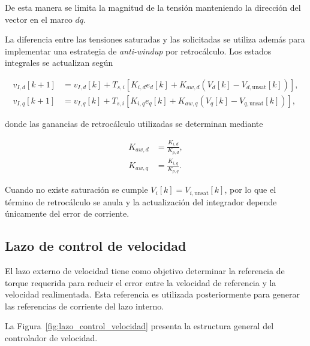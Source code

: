 De esta manera se limita la magnitud de la tensión manteniendo la
dirección del vector en el marco $dq$.

La diferencia entre las tensiones saturadas y las solicitadas se
utiliza además para implementar una estrategia de
\textit{anti-windup} por retrocálculo. Los estados integrales se
actualizan según

\begin{align}
v_{I,d}[k+1]
&=
v_{I,d}[k]
+
T_{s,i}
\left[
K_{i,d}e_d[k]
+
K_{aw,d}
\left(
V_d[k]-V_{d,\mathrm{unsat}}[k]
\right)
\right],
\label{eq:antiwindup_d}
\\
v_{I,q}[k+1]
&=
v_{I,q}[k]
+
T_{s,i}
\left[
K_{i,q}e_q[k]
+
K_{aw,q}
\left(
V_q[k]-V_{q,\mathrm{unsat}}[k]
\right)
\right],
\label{eq:antiwindup_q}
\end{align}

donde las ganancias de retrocálculo utilizadas se determinan mediante

\begin{align}
K_{aw,d}
&=
\frac{K_{i,d}}{K_{p,d}},
\\
K_{aw,q}
&=
\frac{K_{i,q}}{K_{p,q}}.
\end{align}

Cuando no existe saturación se cumple
$V_i[k]=V_{i,\mathrm{unsat}}[k]$, por lo que el término de retrocálculo
se anula y la actualización del integrador depende únicamente del
error de corriente.


\subsection{Lazo de control de velocidad}
\label{subsec:control_velocidad}

El lazo externo de velocidad tiene como objetivo determinar la
referencia de torque requerida para reducir el error entre la
velocidad de referencia y la velocidad realimentada. Esta referencia
es utilizada posteriormente para generar las referencias de corriente
del lazo interno.

La Figura~\ref{fig:lazo_control_velocidad} presenta la estructura
general del controlador de velocidad.

